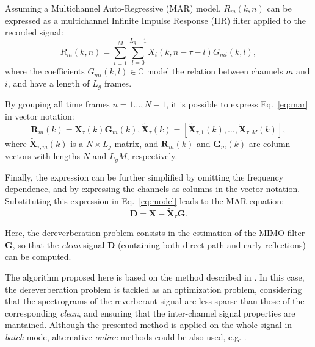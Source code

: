 Assuming a Multichannel Auto-Regressive (MAR) model, $R_m(k, n)$ can be expressed as a multichannel Infinite Impulse Response (IIR) filter applied to the recorded signal:
\begin{equation} 
\label{eq:mar}
	R_m(k, n) = \sum_{i=1}^{M} \sum_{l=0}^{L_g-1} X_i(k,n-\tau-l) G_{mi}(k, l),
\end{equation}
where the coefficients $G_{mi}(k,l) \in \mathbb{C}$  model the relation between channels $m$ and $i$, and have a length of $L_g$ frames. 

By grouping all time frames $n = 1 \ldots, N-1$, it is possible to express Eq.~\ref{eq:mar} in vector notation:
\begin{subequations} 
\begin{equation} 
	\bm{R}_m(k) =  \tilde{\bm{X}}_{\tau}(k) \bm{G}_{m}(k),
\end{equation}
\begin{equation} 
	\tilde{\bm{X}}_{\tau}(k) = [ \tilde{\bm{X}}_{\tau,1}(k), \ldots, \tilde{\bm{X}}_{\tau,M}(k)],
\end{equation}
\end{subequations}
where $\tilde{\bm{X}}_{\tau,m}(k)$ is a $N \times L_g$ matrix, and $\bm{R}_m(k)$ and $\bm{G}_{m}(k)$ are column vectors with lengths $N$ and $L_gM$, respectively.

Finally, the expression can be further simplified by omitting the frequency dependence, and by expressing the channels as columns in the vector notation. Substituting this expression in Eq.~\ref{eq:model} leads to the MAR equation:
\begin{equation} 
\label{eq:D}
	\bm{D} = \bm{X} - \tilde{\bm{X}}_{\tau} \bm{G}.
\end{equation}

Here, the dereverberation problem consists in the estimation of the MIMO filter $\bm{G}$, so that the \textit{clean} signal $\bm{D}$ (containing both direct path and early reflections) can be computed.

The algorithm proposed here is based on the method described in \cite{jukic2015group}. In this case, the dereverberation problem is tackled as an optimization problem, considering that the spectrograms of the reverberant signal are less sparse than those of the corresponding \textit{clean}, and ensuring that the inter-channel signal properties are mantained.
Although the presented method is applied on the whole signal in \textit{batch} mode, alternative \textit{online} methods could be also used, e.g. \cite{braun2016online}.

